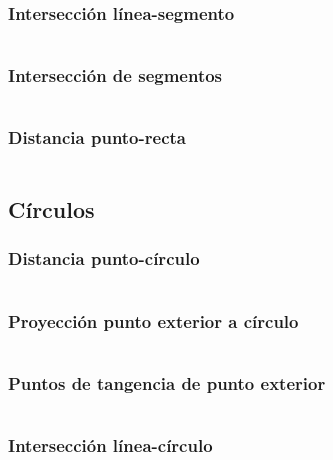 \documentclass[11pt]{article}
\begin{document}
			\subsubsection{Intersección línea-segmento}
			\inputminted[tabsize=2,breaklines,firstline=135,lastline=148,fontsize=\small]{c++}{geometry.cpp}
			
			\subsubsection{Intersección de segmentos}
			\inputminted[tabsize=2,breaklines,firstline=150,lastline=167,fontsize=\small]{c++}{geometry.cpp}
			
			\subsubsection{Distancia punto-recta}
			\inputminted[tabsize=2,breaklines,firstline=169,lastline=172,fontsize=\small]{c++}{geometry.cpp}
			
		\subsection{Círculos}
			\subsubsection{Distancia punto-círculo}
			\inputminted[tabsize=2,breaklines,firstline=391,lastline=394,fontsize=\small]{c++}{geometry.cpp}
			
			\subsubsection{Proyección punto exterior a círculo}
			\inputminted[tabsize=2,breaklines,firstline=396,lastline=399,fontsize=\small]{c++}{geometry.cpp}
			
			\subsubsection{Puntos de tangencia de punto exterior}
			\inputminted[tabsize=2,breaklines,firstline=401,lastline=406,fontsize=\small]{c++}{geometry.cpp}
			
			\subsubsection{Intersección línea-círculo}
			\inputminted[tabsize=2,breaklines,firstline=408,lastline=422,fontsize=\small]{c++}{geometry.cpp}
			
\end{document}
